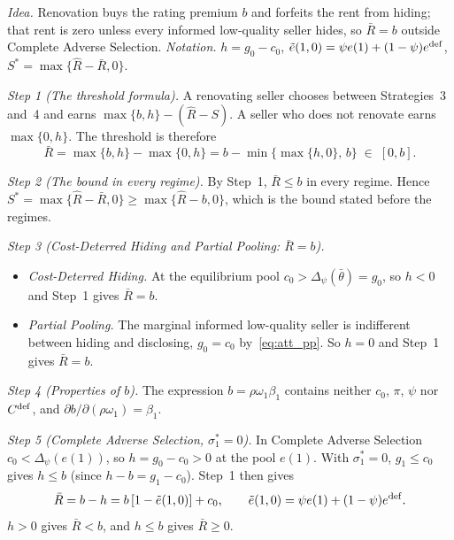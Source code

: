 \upshape
\emph{Idea.} Renovation buys the rating premium $b$ and forfeits the rent from hiding; that rent is zero unless every informed low-quality seller hides, so $\bar R=b$ outside Complete Adverse Selection. \emph{Notation.} $h=g_0-c_0$, $\tilde e(1,0)=\psi e(1)+(1-\psi)e^{\rm def}$, $S^*=\max\{\hat R-\bar R,0\}$.

\emph{Step 1 (The threshold formula).} A renovating seller chooses between Strategies~3 and~4 and earns $\max\{b,h\}-(\hat R-S)$. A seller who does not renovate earns $\max\{0,h\}$. The threshold is therefore
\begin{equation*}
    \bar R=\max\{b,h\}-\max\{0,h\}=b-\min\big\{\max\{h,0\},\,b\big\}\;\in\;[0,b].
\end{equation*}

\emph{Step 2 (The bound in every regime).} By Step~1, $\bar R\le b$ in every regime. Hence $S^*=\max\{\hat R-\bar R,0\}\ge\max\{\hat R-b,0\}$, which is the bound stated before the regimes.

\emph{Step 3 (Cost-Deterred Hiding and Partial Pooling: $\bar R=b$).}
\begin{itemize}
    \item \emph{Cost-Deterred Hiding.} At the equilibrium pool $c_0>\Delta_\psi(\bar\theta)=g_0$, so $h<0$ and Step~1 gives $\bar R=b$.
    \item \emph{Partial Pooling.} The marginal informed low-quality seller is indifferent between hiding and disclosing, $g_0=c_0$ by~\eqref{eq:att_pp}. So $h=0$ and Step~1 gives $\bar R=b$.
\end{itemize}

\emph{Step 4 (Properties of $b$).} The expression $b=\rho\omega_1\beta_1$ contains neither $c_0$, $\pi$, $\psi$ nor $C^{\rm def}$, and $\partial b/\partial(\rho\omega_1)=\beta_1$.

\emph{Step 5 (Complete Adverse Selection, $\sigma_1^*=0$).} In Complete Adverse Selection $c_0<\Delta_\psi(e(1))$, so $h=g_0-c_0>0$ at the pool $e(1)$. With $\sigma_1^*=0$, $g_1\le c_0$ gives $h\le b$ (since $h-b=g_1-c_0$). Step~1 then gives
\begin{equation*}
    \bar R=b-h=b\,[1-\tilde e(1,0)]+c_0,\qquad \tilde e(1,0)=\psi e(1)+(1-\psi)e^{\rm def}.
\end{equation*}
$h>0$ gives $\bar R<b$, and $h\le b$ gives $\bar R\ge0$.

